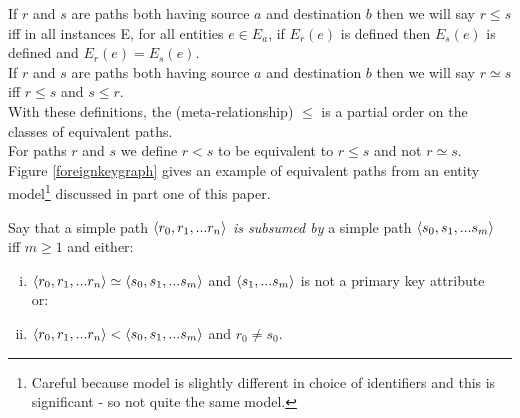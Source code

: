 \documentclass[10pt,a4paper]{article}
\begin{document}
\noindent If $r$ and $s$ are paths both having source $a$ and destination $b$ then we will say $r \leq s$ iff in all instances E, for all 
entities $e \in E_a$, if $E_r(e)$ is defined then $E_s(e)$ is defined and $E_r(e)=E_s(e)$. \\

\noindent If $r$ and $s$ are paths both having source $a$ and destination $b$ then we will say $r \simeq s$ iff $r \leq s$ and $s \leq r$. \\

\noindent With these definitions,  the (meta-relationship) $\leq$ is a partial order on the classes of equivalent paths. \\

\noindent For paths $r$ and $s$ we define $r < s$ to be equivalent to $r \leq s$ and not $r \simeq s$. \\

\noindent Figure \ref{foreignkeygraph} gives an example of equivalent paths from an entity model\footnote{Careful because model is slightly different in choice of identifiers and this is significant - so not quite the same model.} discussed in part one of this paper.


\begin{definition}
Say that a simple path $\langle r_0,r_1,...r_n\rangle$ \textit{is subsumed by} a simple path 
$\langle s_0,s_1,...s_m\rangle$ iff $m \geq 1$ and either:
\begin{enumerate} [(i)]

\item $\langle r_0,r_1,...r_n\rangle \simeq  \langle s_0,s_1,...s_m\rangle$ and 
$\langle s_1,...s_m\rangle$ is not a primary key attribute\\

 \hspace{1cm} or:
\item $\langle r_0,r_1,...r_n\rangle <  \langle s_0,s_1,...s_m\rangle$ and $r_0 \neq s_0$.
\end{enumerate}
\end{definition}
\end{document}

